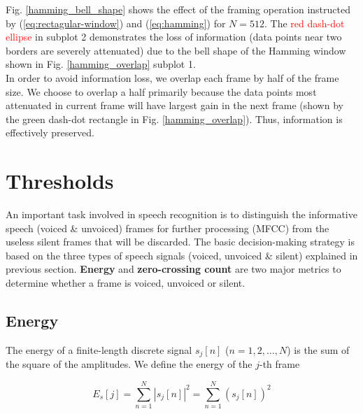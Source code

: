 Fig. \ref{hamming_bell_shape} shows the effect of the framing operation instructed by (\ref{eq:rectagular-window}) and (\ref{eq:hamming}) for $N = 512$. The \textcolor{red}{red dash-dot ellipse} in subplot 2 demonstrates the loss of information (data points near two borders are severely attenuated) due to the bell shape of the Hamming window shown in Fig. \ref{hamming_overlap} subplot 1.\\

In order to avoid information loss, we overlap each frame by half of the frame size. We choose to overlap a half primarily because the data points most attenuated in current frame will have largest gain in the next frame (shown by the \textcolor{green_html}{green dash-dot rectangle} in Fig. \ref{hamming_overlap}). Thus, information is effectively preserved.


\section{Thresholds}
\label{section:pre-processing-last}

An important task involved in speech recognition is to distinguish the informative speech (voiced \& unvoiced) frames for further processing (MFCC) from the useless silent frames that will be discarded. The basic decision-making strategy is based on the three types of speech signals (voiced, unvoiced \& silent) explained in previous section. \textbf{Energy} and \textbf{zero-crossing count} are two major metrics to determine whether a frame is voiced, unvoiced or silent.


\subsection{Energy}

The energy of a finite-length discrete signal $s_j[n]$ ($n = 1, 2, \dots, N$) is the sum of the square of the amplitudes. We define the energy of the $j$-th frame

\begin{equation}
\label{eq:frame-energy}
E_s[j] = \sum_{n=1}^{N} |s_j[n]|^2 = \sum_{n=1}^{N} (s_j[n])^2
\end{equation}


